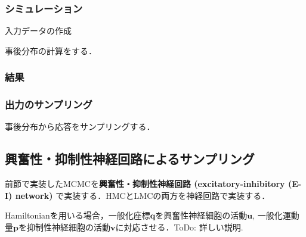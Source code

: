 \subsubsection{シミュレーション}

入力データの作成



事後分布の計算をする．

\subsubsection{結果}




\subsubsection{出力のサンプリング}

事後分布から応答をサンプリングする．




\subsection{興奮性・抑制性神経回路によるサンプリング}
前節で実装したMCMCを\textbf{興奮性・抑制性神経回路 (excitatory-inhibitory (E-I) network)} で実装する．HMCとLMCの両方を神経回路で実装する．

Hamiltonianを用いる場合，一般化座標$\mathbf{q}$を興奮性神経細胞の活動$\mathbf{u}$, 一般化運動量$\mathbf{p}$を抑制性神経細胞の活動$\mathbf{v}$に対応させる．ToDo: 詳しい説明.

